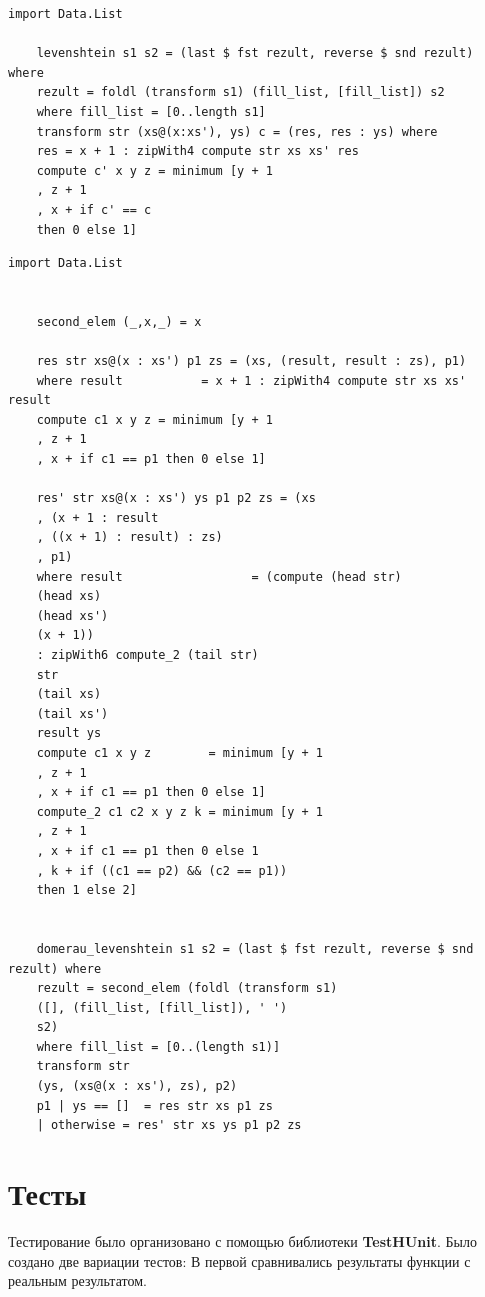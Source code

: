 \documentclass[12pt]{report}
\begin{document}
    \begin{lstlisting}[label=some-code4,caption=Функция нахождения расстояния Левенштейна матрично с хранением матрицы]
    import Data.List
    
    levenshtein s1 s2 = (last $ fst rezult, reverse $ snd rezult) where
    rezult = foldl (transform s1) (fill_list, [fill_list]) s2
    where fill_list = [0..length s1]
    transform str (xs@(x:xs'), ys) c = (res, res : ys) where
    res = x + 1 : zipWith4 compute str xs xs' res
    compute c' x y z = minimum [y + 1
    , z + 1
    , x + if c' == c
    then 0 else 1]
    \end{lstlisting}
    
    \begin{lstlisting}[label=some-code5,caption=Функция нахождения расстояния Дамерау-Левенштейна матрично с хранением матрицы]
    import Data.List
    
    
    second_elem (_,x,_) = x
    
    res str xs@(x : xs') p1 zs = (xs, (result, result : zs), p1)
    where result           = x + 1 : zipWith4 compute str xs xs' result
    compute c1 x y z = minimum [y + 1
    , z + 1
    , x + if c1 == p1 then 0 else 1]
    
    res' str xs@(x : xs') ys p1 p2 zs = (xs
    , (x + 1 : result
    , ((x + 1) : result) : zs)
    , p1)
    where result                  = (compute (head str) 
    (head xs)
    (head xs') 
    (x + 1)) 
    : zipWith6 compute_2 (tail str) 
    str 
    (tail xs) 
    (tail xs') 
    result ys
    compute c1 x y z        = minimum [y + 1
    , z + 1
    , x + if c1 == p1 then 0 else 1]
    compute_2 c1 c2 x y z k = minimum [y + 1
    , z + 1
    , x + if c1 == p1 then 0 else 1
    , k + if ((c1 == p2) && (c2 == p1))
    then 1 else 2]
    
    
    domerau_levenshtein s1 s2 = (last $ fst rezult, reverse $ snd rezult) where
    rezult = second_elem (foldl (transform s1) 
    ([], (fill_list, [fill_list]), ' ') 
    s2)
    where fill_list = [0..(length s1)]
    transform str 
    (ys, (xs@(x : xs'), zs), p2) 
    p1 | ys == []  = res str xs p1 zs
    | otherwise = res' str xs ys p1 p2 zs
    \end{lstlisting}
    
    \section{Тесты}
    Тестирование было организовано с помощью библиотеки  \textbf{TestHUnit}.
    Было создано две вариации тестов:
    В первой сравнивались результаты функции с реальным результатом.
    
\end{document}
